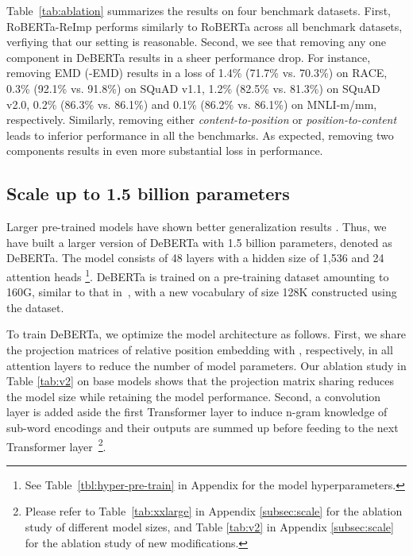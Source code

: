\documentclass{article}
\newcommand\ModelName{DeBERTa}
\begin{document}
Table~\ref{tab:ablation} summarizes the results on four benchmark datasets. 
First, RoBERTa-ReImp performs similarly to RoBERTa across all  benchmark datasets, verfiying that our setting is reasonable. 
Second, we see that removing any one component in {\ModelName} results in a sheer performance drop. 
For instance, removing EMD (-EMD) results in a loss of 1.4\% (71.7\% vs. 70.3\%) on RACE, 0.3\% (92.1\% vs. 91.8\%) on SQuAD v1.1, 1.2\% (82.5\% vs. 81.3\%) on SQuAD v2.0, 0.2\% (86.3\% vs. 86.1\%) and 0.1\% (86.2\% vs. 86.1\%) on MNLI-m/mm, respectively. 
Similarly, removing either \textit{content-to-position} or  \textit{position-to-content} leads to inferior performance in all the benchmarks.
As expected, removing two components results in even more substantial loss in performance. 










































\subsection{Scale up to 1.5 billion parameters}
Larger pre-trained models have shown better generalization results \citep{raffel2019t5,brown2020language, shoeybi2019megatron}. 
Thus, we have built a larger version of DeBERTa with 1.5 billion parameters, denoted as DeBERTa.
The model consists of 48 layers with a hidden size of 1,536 and 24 attention heads
\footnote{See Table~\ref{tbl:hyper-pre-train} in Appendix for the model hyperparameters.}.
DeBERTa is trained on a pre-training dataset amounting to 160G, similar to that in~\cite{liu2019roberta}, with a new vocabulary of size 128K constructed using the dataset.


To train DeBERTa, we optimize the model architecture as follows. 
First, we share the projection matrices of relative position embedding  with , respectively, in all attention layers to reduce the number of model parameters. Our ablation study in Table \ref{tab:v2} on base models shows that the projection matrix sharing reduces the model size while retaining the model performance.
Second, a convolution layer is added aside the first Transformer layer to induce n-gram knowledge of sub-word encodings and their outputs are summed up before feeding to the next Transformer layer~\footnote{Please refer to Table~\ref{tab:xxlarge} in Appendix \ref{subsec:scale} for the ablation study of different model sizes, and Table \ref{tab:v2} in Appendix \ref{subsec:scale} for the ablation study of new modifications.}.
\end{document}
